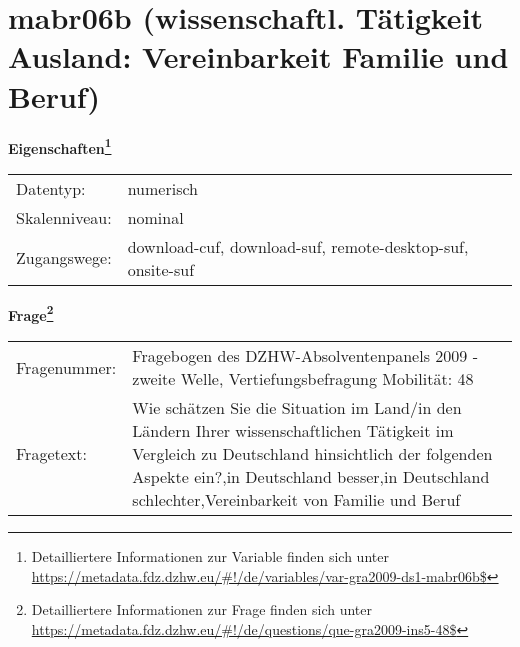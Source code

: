 
    \setcounter{footnote}{0}

    \vspace*{-1.8cm}
	\section{mabr06b (wissenschaftl. Tätigkeit Ausland: Vereinbarkeit Familie und Beruf)}
	\label{section:mabr06b}



    \vspace*{0.5cm}
    \noindent\textbf{Eigenschaften\footnote{Detailliertere Informationen zur Variable finden sich unter
		\url{https://metadata.fdz.dzhw.eu/\#!/de/variables/var-gra2009-ds1-mabr06b$}}}\\
	\begin{tabularx}{\hsize}{@{}lX}
	Datentyp: & numerisch \\
	Skalenniveau: & nominal \\
	Zugangswege: &
	  download-cuf, 
	  download-suf, 
	  remote-desktop-suf, 
	  onsite-suf
 \\
    \end{tabularx}



				\vspace*{0.5cm}
                \noindent\textbf{Frage\footnote{Detailliertere Informationen zur Frage finden sich unter
		              \url{https://metadata.fdz.dzhw.eu/\#!/de/questions/que-gra2009-ins5-48$}}}\\
				\begin{tabularx}{\hsize}{@{}lX}
					Fragenummer: &
					  Fragebogen des DZHW-Absolventenpanels 2009 - zweite Welle, Vertiefungsbefragung Mobilität:
					  48
 \\
					Fragetext: & Wie schätzen Sie die Situation im Land/in den Ländern Ihrer wissenschaftlichen Tätigkeit im Vergleich zu Deutschland hinsichtlich der folgenden Aspekte ein?,in Deutschland besser,in Deutschland schlechter,Vereinbarkeit von Familie und Beruf \\
				\end{tabularx}





